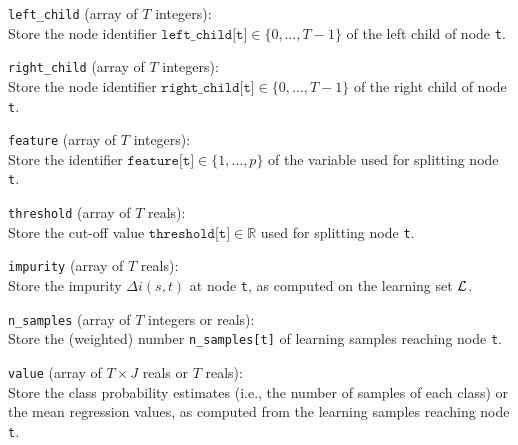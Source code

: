 \begin{description}

\item \texttt{left\_child} (array of $T$ integers):\hfill\\
    Store the node identifier $\texttt{left\_child[t]} \in \{0,\dots,T-1\}$ of the left child of node \texttt{t}.
\item \texttt{right\_child} (array of $T$ integers):\hfill\\
    Store the node identifier $\texttt{right\_child[t]} \in \{0,\dots,T-1\}$ of the right child of node \texttt{t}.
\item \texttt{feature} (array of $T$ integers):\hfill\\
    Store the identifier $\texttt{feature[t]} \in \{1, \dots, p\}$ of the variable used for splitting  node \texttt{t}.
\item \texttt{threshold} (array of $T$ reals):\hfill\\
    Store the cut-off value $\texttt{threshold[t]} \in \mathbb{R}$ used for splitting  node \texttt{t}.
\item \texttt{impurity} (array of $T$ reals):\hfill\\
    Store the impurity $\Delta i(s,t)$ at node \texttt{t}, as computed on the learning set ${\cal L}$.
\item \texttt{n\_samples} (array of $T$ integers or reals):\hfill\\
    Store the (weighted) number \texttt{n\_samples[t]} of learning samples reaching node \texttt{t}.
\item \texttt{value} (array of $T\times J$ reals or $T$ reals):\hfill\\
    Store the class probability estimates (i.e., the number of samples of each class) or the mean regression values,
    as computed from the learning samples reaching node \texttt{t}.

\end{description}

